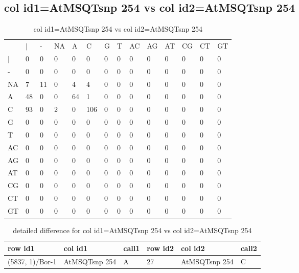 \subsection{col id1=AtMSQTsnp 254 vs col id2=AtMSQTsnp 254}
\begin{center}
\begin{longtable}{|l|l|l|l|l|l|l|l|l|l|l|l|l|l|}
\caption{col id1=AtMSQTsnp 254 vs col id2=AtMSQTsnp 254} \label{table_dm798}\\
\hline
\\
\hline
&$|$&-&NA&A&C&G&T&AC&AG&AT&CG&CT&GT\\
$|$&0&0&0&0&0&0&0&0&0&0&0&0&0\\
-&0&0&0&0&0&0&0&0&0&0&0&0&0\\
NA&7&11&0&4&4&0&0&0&0&0&0&0&0\\
A&48&0&0&64&1&0&0&0&0&0&0&0&0\\
C&93&0&2&0&106&0&0&0&0&0&0&0&0\\
G&0&0&0&0&0&0&0&0&0&0&0&0&0\\
T&0&0&0&0&0&0&0&0&0&0&0&0&0\\
AC&0&0&0&0&0&0&0&0&0&0&0&0&0\\
AG&0&0&0&0&0&0&0&0&0&0&0&0&0\\
AT&0&0&0&0&0&0&0&0&0&0&0&0&0\\
CG&0&0&0&0&0&0&0&0&0&0&0&0&0\\
CT&0&0&0&0&0&0&0&0&0&0&0&0&0\\
GT&0&0&0&0&0&0&0&0&0&0&0&0&0\\
\hline
\end{longtable}
\end{center}

\begin{center}
\begin{longtable}{|l|l|l|l|l|l|}
\caption{detailed difference for col id1=AtMSQTsnp 254 vs col id2=AtMSQTsnp 254} \label{table_dm799}\\
\hline
row id1&col id1&call1&row id2&col id2&call2\\
\hline
(5837, 1)/Bor-1&AtMSQTsnp 254&A&27&AtMSQTsnp 254&C\\
\hline
\end{longtable}
\end{center}

